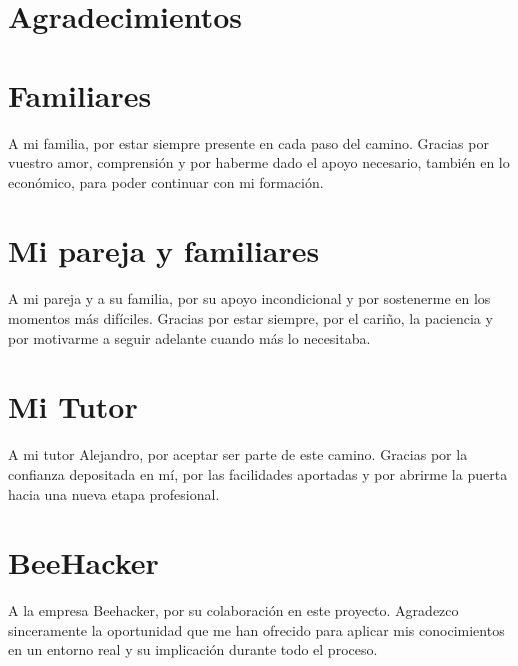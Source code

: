 \documentclass[a4paper, 10pt]{article}
\begin{document}
\section*{Agradecimientos}
\section*{Familiares}

\thispagestyle{empty}

\vfill
\begin{flushright}
\begin{minipage}{0.5\textwidth}
A mi familia, por estar siempre presente en cada paso del camino. Gracias por vuestro amor, comprensión y por haberme dado el apoyo necesario, también en lo económico, para poder continuar con mi formación.
\end{minipage}
\end{flushright}
\clearpage

\section*{Mi pareja y familiares}
\thispagestyle{empty}

\vfill
\begin{flushright}
\begin{minipage}{0.5\textwidth}
A mi pareja y a su familia, por su apoyo incondicional y por sostenerme en los momentos más difíciles. Gracias por estar siempre, por el cariño, la paciencia y por motivarme a seguir adelante cuando más lo necesitaba.
\end{minipage}
\end{flushright}
\clearpage

\section*{Mi Tutor}
\thispagestyle{empty}

\vfill
\begin{flushright}
\begin{minipage}{0.5\textwidth}
A mi tutor Alejandro, por aceptar ser parte de este camino. Gracias por la confianza depositada en mí, por las facilidades aportadas y por abrirme la puerta hacia una nueva etapa profesional.
\end{minipage}
\end{flushright}
\clearpage

\section*{BeeHacker}
\thispagestyle{empty}
\vfill
\begin{flushright}
\begin{minipage}{0.5\textwidth}
A la empresa Beehacker, por su colaboración en este proyecto. Agradezco sinceramente la oportunidad que me han ofrecido para aplicar mis conocimientos en un entorno real y su implicación durante todo el proceso.
\end{minipage}
\end{flushright}
\clearpage
\end{document}
